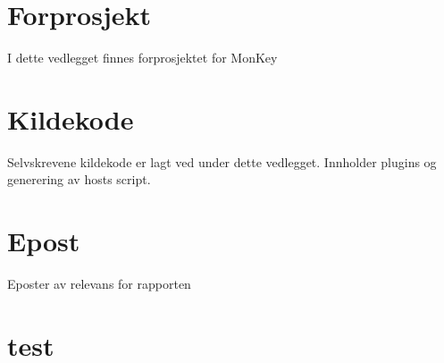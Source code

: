 \documentclass[11pt,norsk,a4paper]{article}
\newenvironment{changemargin}[2]{%
\begin{list}{}{%
\linespread{0.9}%
\setlength{\topsep}{0pt}%
\setlength{\leftmargin}{#1}%
\setlength{\rightmargin}{#2}%
\setlength{\listparindent}{\parindent}%
\setlength{\itemindent}{\parindent}%
\setlength{\parsep}{\parskip}%
}%
\item[]}{\end{list}}
\begin{document}
\begin{appendices}
\section{Forprosjekt}
I dette vedlegget finnes forprosjektet for MonKey


\section{Kildekode}
Selvskrevene kildekode er lagt ved under dette vedlegget. Innholder plugins og generering av hosts script.

\begin{changemargin}{-1cm}{-1cm}


\end{changemargin}

\section{Epost}
Eposter av relevans for rapporten

\section{test}

\end{appendices}
\end{document}
